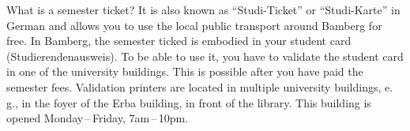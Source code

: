 What is a semester ticket?
It is also known as \enquote{Studi-Ticket} or \enquote{Studi-Karte} in German and allows you to use the local public transport around Bamberg for free.
In Bamberg, the semester ticked is embodied in your student card (Studierendenausweis).
To be able to use it, you have to validate the student card in one of the university buildings.
This is possible after you have paid the semester fees.
Validation printers are located in multiple university buildings, e.\,g., in the foyer of the Erba building, in front of the library.
This building is opened Monday\,--\,Friday, 7am\,--\,10pm. 
